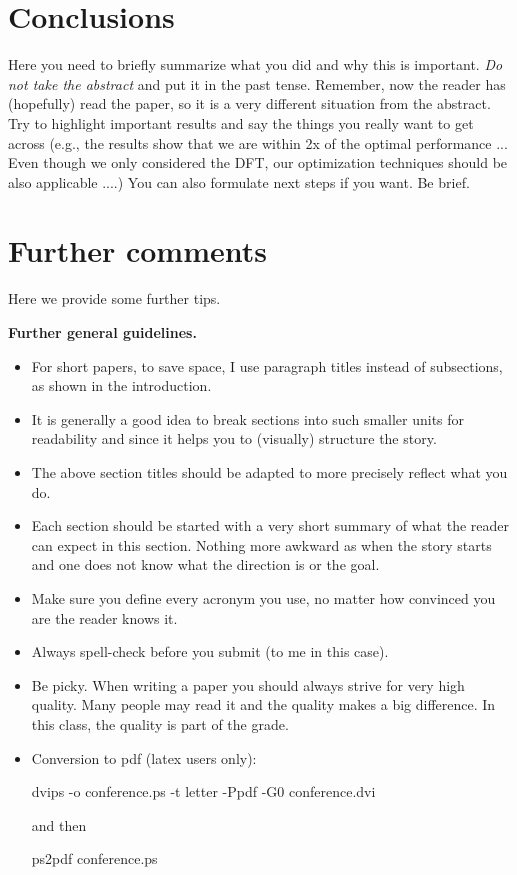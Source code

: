\documentclass[letterpaper]{article}
\newcommand{\mypar}[1]{{\bf #1.}}
\begin{document}
\section{Conclusions}

Here you need to briefly summarize what you did and why this is
important. {\em Do not take the abstract} and put it in the past
tense. Remember, now the reader has (hopefully) read the paper, so it
is a very different situation from the abstract. Try to highlight
important results and say the things you really want to get across
(e.g., the results show that we are within 2x of the optimal performance ... 
Even though we only considered the DFT, our optimization
techniques should be also applicable ....) You can also formulate next
steps if you want. Be brief.

\section{Further comments}

Here we provide some further tips.

\mypar{Further general guidelines}

\begin{itemize}
\item For short papers, to save space, I use paragraph titles instead of
subsections, as shown in the introduction.

\item It is generally a good idea to break sections into such smaller
units for readability and since it helps you to (visually) structure the story.

\item The above section titles should be adapted to more precisely
reflect what you do.

\item Each section should be started with a very
short summary of what the reader can expect in this section. Nothing
more awkward as when the story starts and one does not know what the
direction is or the goal.

\item Make sure you define every acronym you use, no matter how
convinced you are the reader knows it.

\item Always spell-check before you submit (to me in this case).

\item Be picky. When writing a paper you should always strive for very
high quality. Many people may read it and the quality makes a big difference.
In this class, the quality is part of the grade.

\item Conversion to pdf (latex users only): 

dvips -o conference.ps -t letter -Ppdf -G0 conference.dvi

and then

ps2pdf conference.ps
\end{itemize}
\end{document}
